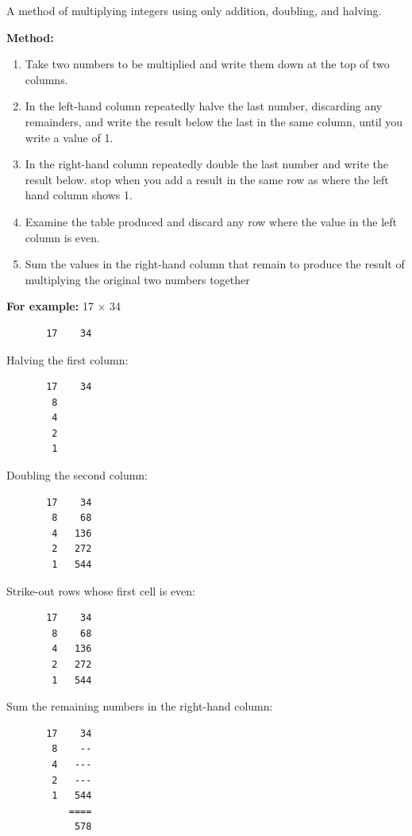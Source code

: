 A method of multiplying integers using only addition, doubling, and
halving.

\textbf{Method:}\\

\begin{enumerate}
\item
  Take two numbers to be multiplied and write them down at the top of
  two columns.
\item
  In the left-hand column repeatedly halve the last number, discarding
  any remainders, and write the result below the last in the same
  column, until you write a value of 1.
\item
  In the right-hand column repeatedly double the last number and write
  the result below. stop when you add a result in the same row as where
  the left hand column shows 1.
\item
  Examine the table produced and discard any row where the value in the
  left column is even.
\item
  Sum the values in the right-hand column that remain to produce the
  result of multiplying the original two numbers together
\end{enumerate}

\textbf{For example:} 17 × 34

\begin{verbatim}
       17    34
\end{verbatim}

Halving the first column:

\begin{verbatim}
       17    34
        8
        4
        2
        1
\end{verbatim}

Doubling the second column:

\begin{verbatim}
       17    34
        8    68
        4   136 
        2   272
        1   544
\end{verbatim}

Strike-out rows whose first cell is even:

\begin{verbatim}
       17    34
        8    68 
        4   136 
        2   272 
        1   544
\end{verbatim}

Sum the remaining numbers in the right-hand column:

\begin{verbatim}
       17    34
        8    -- 
        4   --- 
        2   --- 
        1   544
           ====
            578
\end{verbatim}

